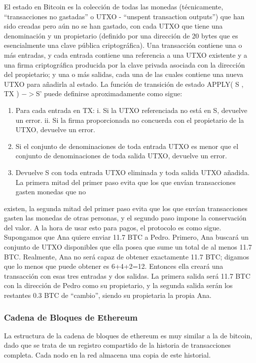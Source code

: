 \documentclass[11pt,a4paper]{article}
\begin{document}
El estado en Bitcoin es la colección de todas las monedas (técnicamente, “transacciones no
gastadas” o UTXO - “unspent transaction outputs”) que han sido creadas pero aún no se han
gastado, con cada UTXO que tiene una denominación y un propietario (definido por una dirección
de 20 bytes que es esencialmente una clave pública criptográfica). Una transacción contiene una
o más entradas, y cada entrada contiene una referencia a una UTXO existente y a una firma
criptográfica producida por la clave privada asociada con la dirección del propietario; y una o más
salidas, cada una de las cuales contiene una nueva UTXO para añadirla al estado.
La función de transición de estado APPLY( S , TX ) $->$S' puede definirse aproximadamente
como sigue:
\begin{enumerate}
\item Para cada entrada en TX:
i. Si la UTXO referenciada no está en S, devuelve un error.
ii. Si la firma proporcionada no concuerda con el propietario de la UTXO, devuelve
un error.
\item Si el conjunto de denominaciones de toda entrada UTXO es menor que el conjunto de
denominaciones de toda salida UTXO, devuelve un error.
\item Devuelve S con toda entrada UTXO eliminada y toda salida UTXO añadida.
La primera mitad del primer paso evita que los que envían transacciones gasten monedas que no
\end{enumerate}
existen, la segunda mitad del primer paso evita que los que envían transacciones gasten las
monedas de otras personas, y el segundo paso impone la conservación del valor. A la hora de
usar esto para pagos, el protocolo es como sigue. Supongamos que Ana quiere enviar 11.7 BTC a
Pedro. Primero, Ana buscará un conjunto de UTXO disponibles que ella posea que sume un total
de al menos 11.7 BTC. Realmente, Ana no será capaz de obtener exactamente 11.7 BTC;
digamos que lo menos que puede obtener es 6+4+2=12. Entonces ella creará una transacción con
esas tres entradas y dos salidas. La primera salida será 11.7 BTC con la dirección de Pedro como
su propietario, y la segunda salida serán los restantes 0.3 BTC de “cambio”, siendo su propietaria
la propia Ana.

\subsubsection{Cadena de Bloques de Ethereum}
La estructura de la cadena de bloques de ethereum es muy similar a la de bitcoin, dado que se trata de un registro compartido de la historia de transacciones completa. Cada nodo en la red almacena una copia de este historial.\\
\end{document}
